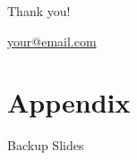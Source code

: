 \documentclass[10pt]{beamer}
\newcommand*{\RefsPath}{./references}
\newcommand*{\RefsPath}{./references}
\begin{document}
\begin{frame}
    \centering
    \begin{LARGE}Thank you!\end{LARGE}

    \vspace{1em}

    \begin{Large}\href{mailto:your@email.com}{your@email.com}\end{Large}

\end{frame}


\newsavebox\mytempbib

\savebox\mytempbib{\parbox{\textwidth}{}}


\section*{Appendix}

\appendix
\backupbegin

\begin{frame}
  \centering
  \begin{LARGE}Backup Slides\end{LARGE}
\end{frame}

\backupend

\end{document}
